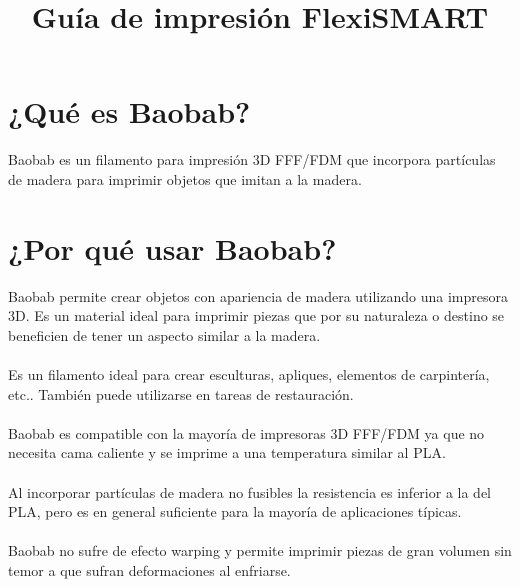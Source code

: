 \documentclass[11pt,a4paper]{article}
\title{Guía de impresión FlexiSMART}
\date{}
\begin{document}

\section{¿Qué es Baobab?}Baobab es un filamento para impresión 3D FFF/FDM que incorpora partículas de madera para imprimir objetos que imitan a la madera. 
\section{¿Por qué usar Baobab?}
Baobab permite crear objetos con apariencia de madera utilizando una impresora 3D. Es un material ideal para imprimir piezas que por su naturaleza o destino se beneficien de tener un aspecto similar a la madera.\\\\
Es un filamento ideal para crear esculturas, apliques, elementos de carpintería, etc.. También puede utilizarse en tareas de restauración.\\\\
Baobab es compatible con la mayoría de impresoras 3D FFF/FDM ya que no necesita cama caliente y se imprime a una temperatura similar al PLA.\\\\
Al incorporar partículas de madera no fusibles la resistencia es inferior a la del PLA, pero es en general suficiente para la mayoría de aplicaciones típicas.\\\\
Baobab no sufre de efecto warping y permite imprimir piezas de gran volumen sin temor a que sufran deformaciones al enfriarse.
\end{document}
